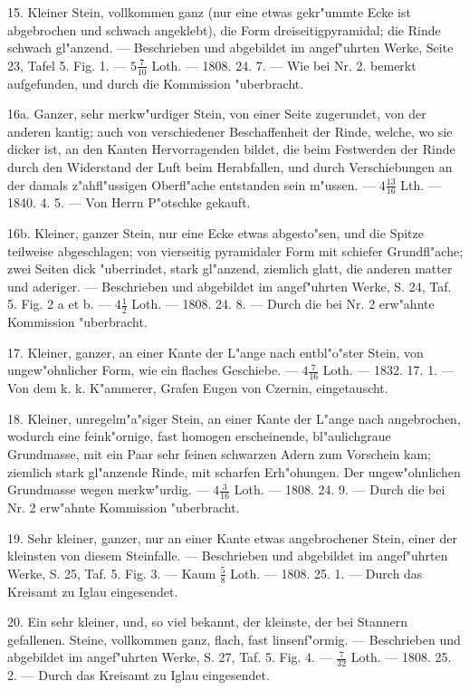 \documentclass[a4paper, 11pt, oneside, polutonikogreek, german]{article}
\begin{document}
15. Kleiner Stein, vollkommen ganz (nur eine etwas gekr"ummte Ecke ist abgebrochen und schwach angeklebt), die Form dreiseitigpyramidal; die Rinde schwach gl"anzend. --- Beschrieben und abgebildet im angef"uhrten Werke, Seite 23, Tafel 5. Fig. 1. --- $\mathfrak{5\frac{7}{10}}$ Loth. --- 1808. 24. 7. --- Wie bei Nr. 2. bemerkt aufgefunden, und durch die Kommission "uberbracht.

16a. Ganzer, sehr merkw"urdiger Stein, von einer Seite zugerundet, von der anderen kantig; auch von verschiedener Beschaffenheit der Rinde, welche, wo sie dicker ist, an den Kanten Hervorragenden bildet, die beim Festwerden der Rinde durch den Widerstand der Luft beim Herabfallen, und durch Verschiebungen an der damals z"ahfl"ussigen Oberfl"ache entstanden sein m"ussen. --- $\mathfrak{4\frac{13}{16}}$ Lth. --- 1840. 4. 5. --- Von Herrn P"otschke gekauft. 

16b. Kleiner, ganzer Stein, nur eine Ecke etwas abgesto"sen, und die Spitze teilweise abgeschlagen; von vierseitig pyramidaler Form mit schiefer Grundfl"ache; zwei Seiten dick "uberrindet, stark gl"anzend, ziemlich glatt, die anderen matter und aderiger. --- Beschrieben und abgebildet im angef"uhrten Werke, S. 24, Taf. 5. Fig. 2 a et b. --- $\mathfrak{4\frac{1}{2}}$ Loth. --- 1808. 24. 8. --- Durch die bei Nr. 2 erw"ahnte Kommission "uberbracht.

17. Kleiner, ganzer, an einer Kante der L"ange nach entbl"o"ster Stein, von ungew"ohnlicher Form, wie ein flaches Geschiebe. --- $\mathfrak{4\frac{7}{16}}$ Loth. --- 1832. 17. 1. --- Von dem k. k. K"ammerer, Grafen Eugen von Czernin, eingetauscht.

18. Kleiner, unregelm"a"siger Stein, an einer Kante der L"ange nach angebrochen, wodurch eine feink"ornige, fast homogen erscheinende, bl"aulichgraue Grundmasse, mit ein Paar sehr feinen schwarzen Adern zum Vorschein kam; ziemlich stark gl"anzende Rinde, mit scharfen Erh"ohungen. Der ungew"ohnlichen Grundmasse wegen merkw"urdig. --- $\mathfrak{4\frac{3}{16}}$ Loth. --- 1808. 24. 9. --- Durch die bei Nr. 2 erw"ahnte Kommission "uberbracht.

19. Sehr kleiner, ganzer, nur an einer Kante etwas angebrochener Stein, einer der kleinsten von diesem Steinfalle. --- Beschrieben und abgebildet im angef"uhrten Werke, S. 25, Taf. 5. Fig. 3. --- Kaum $\mathfrak{\frac{5}{8}}$ Loth. --- 1808. 25. 1. --- Durch das Kreisamt zu Iglau eingesendet.

20. Ein sehr kleiner, und, so viel bekannt, der kleinste, der bei Stannern gefallenen. Steine, vollkommen ganz, flach, fast linsenf"ormig. --- Beschrieben und abgebildet im angef"uhrten Werke, S. 27, Taf. 5. Fig. 4. --- $\mathfrak{\frac{7}{32}}$ Loth. --- 1808. 25. 2. --- Durch das Kreisamt zu Iglau eingesendet.
\end{document}
